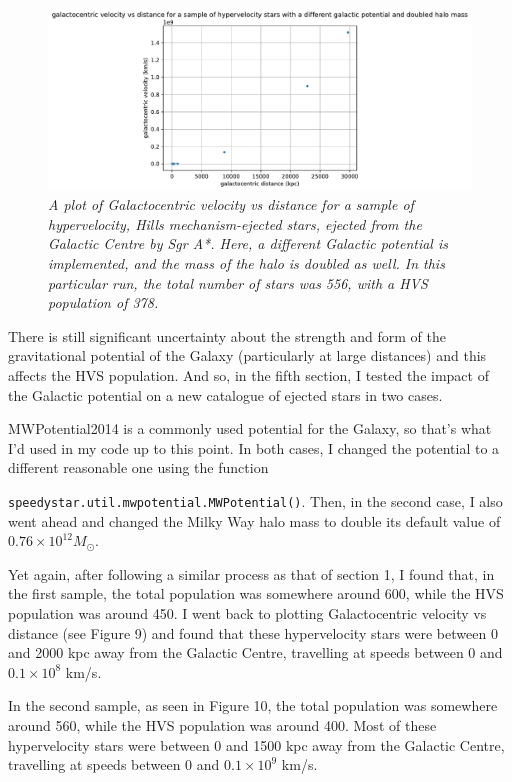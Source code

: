 \documentclass{article}
\begin{document}
\begin{figure}[h!]
\caption{\textit{A plot of Galactocentric velocity vs distance for a sample of hypervelocity, Hills mechanism-ejected stars, ejected from the Galactic Centre by Sgr A*. Here, a different Galactic potential is implemented, and the mass of the halo is doubled as well. In this particular run, the total number of stars was 556, with a HVS population of 378.}}
\includegraphics[width=1.1\textwidth]{GCv_vs_GCdist_hyp_5b.pdf}
\end{figure}

There is still significant uncertainty about the strength and form of the gravitational potential of the Galaxy (particularly at large distances) and this affects the HVS population. And so, in the fifth section, I tested the impact of the Galactic potential on a new catalogue of ejected stars in two cases. 

MWPotential2014 is a commonly used potential for the Galaxy, so that's what I'd used in my code up to this point. In both cases, I changed the potential to a different reasonable one using the function 

\noindent\texttt{speedystar.util.mwpotential.MWPotential()}. Then, in the second case, I also went ahead and changed the Milky Way halo mass to double its default value of $0.76 \times 10^{12} M_{\odot}$.

\vspace{1cm}

Yet again, after following a similar process as that of section 1, I found that, in the first sample, the total population was somewhere around 600, while the HVS population was around 450. I went back to plotting Galactocentric velocity vs distance (see Figure 9) and found that these hypervelocity stars were between 0 and 2000 kpc away from the Galactic Centre, travelling at speeds between 0 and $0.1 \times 10^8$ km/s. 

In the second sample, as seen in Figure 10, the total population was somewhere around 560, while the HVS population was around 400. Most of these hypervelocity stars were between 0 and 1500 kpc away from the Galactic Centre, travelling at speeds between 0 and $0.1 \times 10^9$ km/s. 
\end{document}
